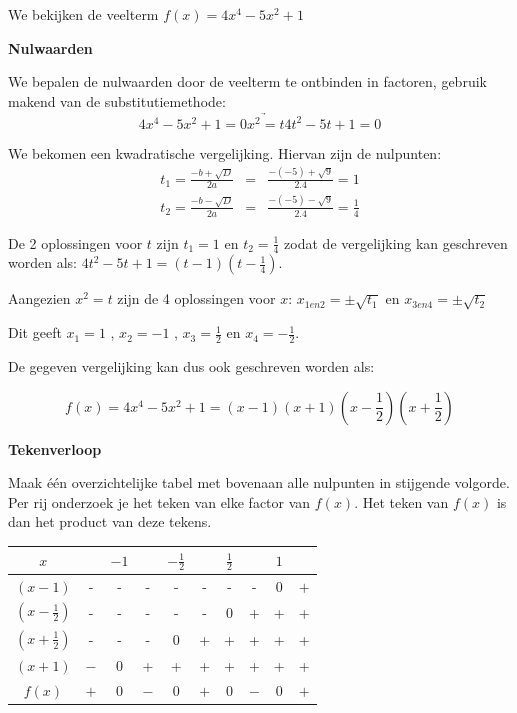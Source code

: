 We bekijken de veelterm $f(x)=4x^{4}-5x^{2}+1$

\textbf{Nulwaarden}

\noindent We bepalen de nulwaarden door de veelterm te ontbinden in
factoren, gebruik makend van de substitutiemethode:\\

\begin{equation*}
4x^{4}-5x^{2}+1=0  \underrightarrow{x^{2}=t}  4t^{2}-5t+1=0
\end{equation*}

\noindent We bekomen een kwadratische vergelijking. Hiervan zijn de
nulpunten:
\begin{eqnarray*}
t_{1}=\frac{-b+\sqrt{D}}{2a}&=&\frac{-(-5)+\sqrt{9}}{2.4}=1 \\
t_{2}=\frac{-b-\sqrt{D}}{2a}&=&\frac{-(-5)-\sqrt{9}}{2.4}=\frac{1}{4}
\end{eqnarray*}

De 2 oplossingen voor $t$ zijn $t_{1}=1$ en $t_{2}=\frac{1}{4}$
zodat de vergelijking kan geschreven worden als: $4t^{2}-5t+1=(t-1)(t-\frac{1}{4})$.

Aangezien $x^{2}=t$ zijn de 4 oplossingen voor $x$: $x_{1en2}=\pm\sqrt{t_{1}}$
en $x_{3en4}=\pm\sqrt{t_{2}}$ 

Dit geeft $x_{1}=1$ , $x_{2}=-1$ , $x_{3}=\frac{1}{2}$
en $x_{4}=-\frac{1}{2}$.

De gegeven vergelijking kan dus ook geschreven worden als:

\begin{equation*}
f(x)=4x^{4}-5x^{2}+1=(x-1)(x+1)(x-\frac{1}{2})(x+\frac{1}{2})
\end{equation*}

\textbf{Tekenverloop}

Maak \'e\'en overzichtelijke tabel met bovenaan alle nulpunten
in stijgende volgorde. Per rij onderzoek je het teken van elke factor
van $f(x)$. Het teken van $f(x)$ is dan het product van deze tekens.

\begin{center}
\begin{tabular}{c||ccccccccc}
$x$ &  & $-1$ &  & $-\frac{1}{2}$ &  & $\frac{1}{2}$ &  & $1$ & \\
\hline 
$(x-1)$ & - & - & - & - & - & - & - & $0$ & $+$\\
$(x-\frac{1}{2})$ & - & - & - & - & -  & $0$ & + & + & + \\
$(x+\frac{1}{2})$ & - & - & - & $0$ & + & + & + & + & + \\
$(x+1)$ & $-$ & $0$ & + & + & + & + & + & + & + \\
\hline 
$f(x)$ & $+$ & $0$ & $-$ & $0$ & $+$ & $0$ & $-$ & $0$ & $+$\\
\end{tabular}
\end{center}


